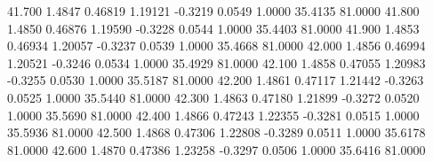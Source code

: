  41.700   1.4847   0.46819   1.19121  -0.3219   0.0549   1.0000  35.4135  81.0000
  41.800   1.4850   0.46876   1.19590  -0.3228   0.0544   1.0000  35.4403  81.0000
  41.900   1.4853   0.46934   1.20057  -0.3237   0.0539   1.0000  35.4668  81.0000
  42.000   1.4856   0.46994   1.20521  -0.3246   0.0534   1.0000  35.4929  81.0000
  42.100   1.4858   0.47055   1.20983  -0.3255   0.0530   1.0000  35.5187  81.0000
  42.200   1.4861   0.47117   1.21442  -0.3263   0.0525   1.0000  35.5440  81.0000
  42.300   1.4863   0.47180   1.21899  -0.3272   0.0520   1.0000  35.5690  81.0000
  42.400   1.4866   0.47243   1.22355  -0.3281   0.0515   1.0000  35.5936  81.0000
  42.500   1.4868   0.47306   1.22808  -0.3289   0.0511   1.0000  35.6178  81.0000
  42.600   1.4870   0.47386   1.23258  -0.3297   0.0506   1.0000  35.6416  81.0000
